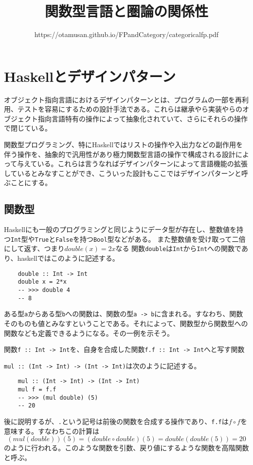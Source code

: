 \documentclass[uplatex,dvipdfmx]{jsarticle}
\newcommand{\pr}[1]{\colorbox[rgb]{0.9,0.9,0.9}{\lstinline{#1}}}
\newcommand{\functype}[2]{\pr{#1 -> #2}}
\newcommand{\fpmor}[3]{\pr{#1 :: #2 -> #3}}
\begin{document}
  \title{関数型言語と圏論の関係性}
  \author{https://otamusan.github.io/FPandCategory/categoricalfp.pdf}
  \maketitle
	\tableofcontents
  \pagebreak
  \section{Haskellとデザインパターン}
  オブジェクト指向言語におけるデザインパターンとは、プログラムの一部を再利用、テストを容易にするための設計手法である。これらは継承やら実装やらのオブジェクト指向言語特有の操作によって抽象化されていて、さらにそれらの操作で閉じている。

  関数型プログラミング、特にHaskellではリストの操作や入出力などの副作用を伴う操作を、抽象的で汎用性があり極力関数型言語の操作で構成される設計によって与えている。これらは言うなればデザインパターンによって言語機能の拡張しているとみなすことができ、こういった設計もここではデザインパターンと呼ぶことにする。

  \subsection{関数型}
  Haskellにも一般のプログラミングと同じようにデータ型が存在し、整数値を持つ\pr{Int}型や\pr{True}と\pr{False}を持つ\pr{Bool}型などがある。
  また整数値を受け取って二倍にして返す、つまり$double(x)=2x$なる
  関数\pr{double}は\pr{Int}から\pr{Int}への関数であり、haskellではこのように記述する。
  \begin{lstlisting}
    double :: Int -> Int
    double x = 2*x
    -- >>> double 4
    -- 8
  \end{lstlisting}
  ある型\pr{a}からある型\pr{b}への関数は、関数の型\functype{a}{b}に含まれる。すなわち、関数そのものも値とみなすということである。それによって、関数型から関数型への関数なども定義できるようになる。その一例を示そう。

  関数\fpmor{f}{Int}{Int}を、自身を合成した関数\fpmor{f.f}{Int}{Int}へと写す関数
  
  \fpmor{mul}{(Int -> Int)}{(Int -> Int)}は次のように記述する。
  \begin{lstlisting}
    mul :: (Int -> Int) -> (Int -> Int)
    mul f = f.f
    -- >>> (mul double) (5)
    -- 20
  \end{lstlisting}
  後に説明するが、\pr{.}という記号は前後の関数を合成する操作であり、\pr{f.f}は$f\circ f$を意味する。すなわちこの計算は
  \[(mul(double))(5)=(double \circ double)(5)=double(double(5))=20\]のように行われる。このような関数を引数、戻り値にするような関数を高階関数と呼ぶ。
  
\end{document}
